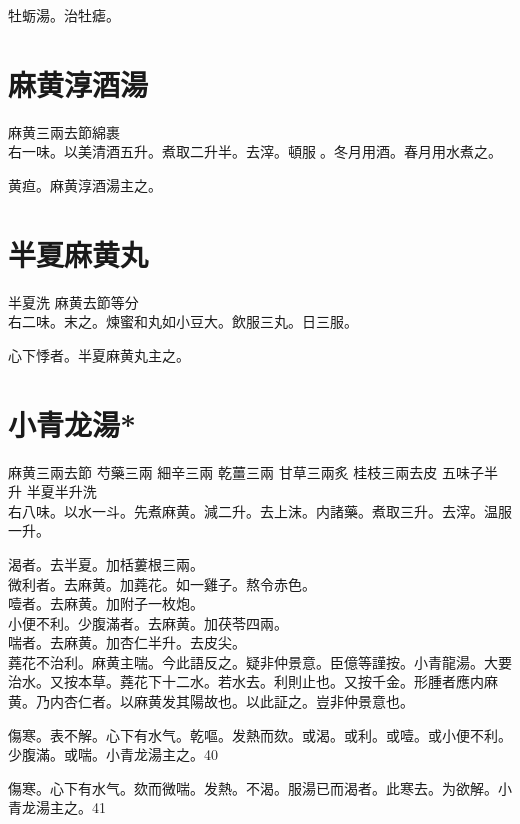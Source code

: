 牡蛎湯。治牡瘧。

\section{麻黄淳酒湯}

麻黄{\scriptsize 三兩去節綿裹}\\
右一味。以美清酒五升。煮取二升半。去滓。頓服{\sungtpii 𥁞}。冬月用酒。春月用水煮之。

黄疸。麻黄淳酒湯主之。

\section{半夏麻黄丸}

半夏{\scriptsize 洗} 麻黄{\scriptsize 去節等分}\\
右二味。末之。煉蜜和丸如小豆大。飲服三丸。日三服。

心下悸者。半夏麻黄丸主之。

\section{小青龙湯*}

麻黄{\scriptsize 三兩去節} 芍藥{\scriptsize 三兩} 細辛{\scriptsize 三兩} 乾薑{\scriptsize 三兩} 甘草{\scriptsize 三兩炙} 桂枝{\scriptsize 三兩去皮} 五味子{\scriptsize 半升} 半夏{\scriptsize 半升洗}\\
右八味。以水一斗。先煮麻黄。減二升。去上沫。内諸藥。煮取三升。去滓。温服一升。

渴者。去半夏。加栝蔞根三兩。\\
微利者。去麻黄。加蕘花。如一雞子。熬令赤色。\\
噎者。去麻黄。加附子一枚炮。\\
小便不利。少腹滿者。去麻黄。加茯苓四兩。\\
喘者。去麻黄。加杏仁半升。去皮尖。\\
蕘花不治利。麻黄主喘。今此語反之。疑非仲景意。{\scriptsize 臣億等謹按。小青龍湯。大要治水。又按本草。蕘花下十二水。若水去。利則止也。又按千金。形腫者應内麻黄。乃内杏仁者。以麻黄发其陽故也。以此証之。豈非仲景意也。}

傷寒。表不解。心下有水气。乾嘔。发熱而欬。或渴。或利。或噎。或小便不利。少腹滿。或喘。小青龙湯主之。40

傷寒。心下有水气。欬而微喘。发熱。不渴。服湯已而渴者。此寒去。为欲解。小青龙湯主之。41


